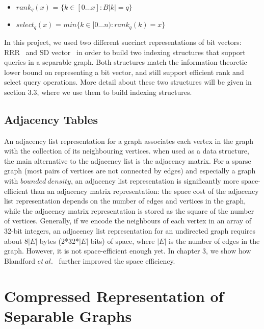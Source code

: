 \documentclass[12pt,glossary]{dalthesis}
\begin{document}
\begin{itemize}[noitemsep]
\item $rank_{q}(x)$ = $\{k \in [0...x] : B|k| = q \}$
\item $select_{q}(x)$ = $ min \{ k \in [0...n) : rank_{q}(k) = x \} $ 
\end{itemize}


In this project, we used two different succinct representations of bit vectors: RRR~\cite{RRR} and SD vector~\cite{SD-vector} in order to build two indexing structures that support queries in a separable graph. Both structures match the information-theoretic lower bound on representing a bit vector, and still support efficient rank and select query operations. More detail about these two structures will be given in section 3.3, where we use them to build indexing structures.

\bigskip
\bigskip
\section{Adjacency Tables}
An adjacency list representation for a graph associates each vertex in the graph with the collection of its neighbouring vertices. when used as a data structure, the main alternative to the adjacency list is the adjacency matrix. For a sparse graph (most pairs of vertices are not connected by edges) and especially a graph with $bounded \ density$, an adjacency list representation is significantly more space-efficient than an adjacency matrix representation: the space cost of the adjacency list representation depends on the number of edges and vertices in the graph, while the adjacency matrix representation is stored as the square of the number of vertices. Generally, if we encode the neighbours of each vertex in an array of 32-bit integers, an adjacency list representation for an undirected graph requires about 8$|E|$ bytes (2*32*$|E|$ bits) of space, where $|E|$ is the number of edges in the graph. However, it is not space-efficient enough yet. In chapter 3, we show how Blandford $et \ al.$~\cite{compact-representation} further improved the space efficiency.



\chapter{Compressed Representation of Separable Graphs}
\end{document}

